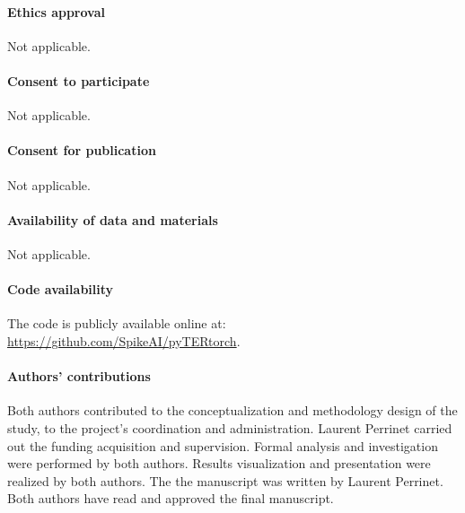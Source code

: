 \documentclass[default]{sn-jnl}%
\theoremstyle{thmstyleone}%
\theoremstyle{thmstyletwo}%
\theoremstyle{thmstylethree}%
\begin{document}
\paragraph{Ethics approval}
Not applicable.

\paragraph{Consent to participate}
Not applicable.

\paragraph{Consent for publication}
Not applicable.

\paragraph{Availability of data and materials}
Not applicable.

\paragraph{Code availability}

The code is publicly available online at: \url{https://github.com/SpikeAI/pyTERtorch}.

\paragraph{Authors' contributions}

Both authors contributed to the conceptualization and methodology design of the study, to the project's coordination and administration. Laurent Perrinet carried out the funding acquisition and supervision. Formal analysis and investigation were performed by both authors. Results visualization and presentation were realized by both authors. The the manuscript was written by Laurent Perrinet. Both authors have read and approved the final manuscript.


\end{document}
